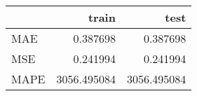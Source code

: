 \begin{tabular}{lrr}
\toprule
{} &        train &         test \\
\midrule
MAE  &     0.387698 &     0.387698 \\
MSE  &     0.241994 &     0.241994 \\
MAPE &  3056.495084 &  3056.495084 \\
\bottomrule
\end{tabular}

